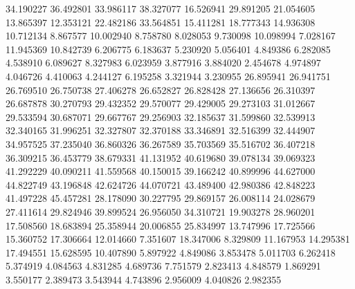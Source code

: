 34.190227
36.492801
33.986117
38.327077
16.526941
29.891205
21.054605
13.865397
12.353121
22.482186
33.564851
15.411281
18.777343
14.936308
10.712134
8.867577
10.002940
8.758780
8.028053
9.730098
10.098994
7.028167
11.945369
10.842739
6.206775
6.183637
5.230920
5.056401
4.849386
6.282085
4.538910
6.089627
8.327983
6.023959
3.877916
3.884020
2.454678
4.974897
4.046726
4.410063
4.244127
6.195258
3.321944
3.230955
26.895941
26.941751
26.769510
26.750738
27.406278
26.652827
26.828428
27.136656
26.310397
26.687878
30.270793
29.432352
29.570077
29.429005
29.273103
31.012667
29.533594
30.687071
29.667767
29.256903
32.185637
31.599860
32.539913
32.340165
31.996251
32.327807
32.370188
33.346891
32.516399
32.444907
34.957525
37.235040
36.860326
36.267589
35.703569
35.516702
36.407218
36.309215
36.453779
38.679331
41.131952
40.619680
39.078134
39.069323
41.292229
40.090211
41.559568
40.150015
39.166242
40.899996
44.627000
44.822749
43.196848
42.624726
44.070721
43.489400
42.980386
42.848223
41.497228
45.457281
28.178090
30.227795
29.869157
26.008114
24.028679
27.411614
29.824946
39.899524
26.956050
34.310721
19.903278
28.960201
17.508560
18.683894
25.358944
20.006855
25.834997
13.747996
17.725566
15.360752
17.306664
12.014660
7.351607
18.347006
8.329809
11.167953
14.295381
17.494551
15.628595
10.407890
5.897922
4.849086
3.853478
5.011703
6.262418
5.374919
4.084563
4.831285
4.689736
7.751579
2.823413
4.848579
1.869291
3.550177
2.389473
3.543944
4.743896
2.956009
4.040826
2.982355
